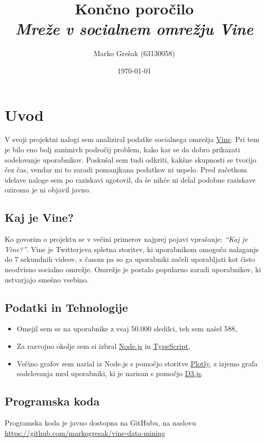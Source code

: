 \documentclass[a4paper,11pt]{article}
\title{\huge{Končno poročilo} \\ \Large{\em{Mreže v socialnem omrežju Vine}}}
\author{Marko Grešak (63130058)}
\date{\today}
\begin{document}
\maketitle

\section{Uvod}

V svoji projektni nalogi sem analiziral podatke socialnega omrežja \href{https://vine.co}{\underline{Vine}}. Pri tem je bilo eno bolj zanimivh področij problem, kako kar se da dobro prikazati sodelovanje uporabnikov. Poskušal sem tudi odkriti, kakšne skupnosti se tvorijo čez čas, vendar mi to zaradi pomanjkana podatkov ni uspelo. Pred začetkom idelave naloge sem po raziskavi ugotovil, da še nihče ni delal podobne raziskave oziroma je ni objavil javno.

\subsection{Kaj je Vine?}

Ko govorim o projektu se v večini primerov najprej pojavi vprašanje: \textit{“Kaj je Vine?”}. Vine je Twitterjeva spletna storitev, ki uporabnikom omogoča nalaganje do 7 sekundnih videov, s časom pa so ga uporabniki začeli uporabljati kot čisto neodvisno socialno omrežje. Omrežje je postalo popularno zaradi uporabnikov, ki ustvarjajo smešno vsebino.

\subsection{Podatki in Tehnologije}

\begin{itemize}
  \item Omejil sem se na uporabnike z vsaj 50.000 sledilci, teh sem našel 588,
  \item Za razvojno okolje sem si izbral \href{https://nodejs.org/}{\underline{Node.js}} in \href{http://www.typescriptlang.org/}{\underline{TypeScript}},
  \item Večino grafov sem narial iz Node.js s pomočjo storitve \href{https://plot.ly/}{\underline{Plotly}}, z izjemo grafa sodelovanja med uporabniki, ki je narisan s pomočjo \href{http://d3js.org/}{\underline{D3.js}}.
\end{itemize}

\subsection{Programska koda}
Programska koda je javno dostopna na GitHubu, na naslovu\\
\href{https://github.com/markogresak/vine-data-mining}{\underline{https://github.com/markogresak/vine-data-mining}}
\end{document}
